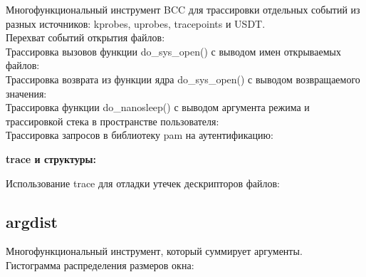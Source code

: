 Многофункциональный инструмент BCC для трассировки отдельных
событий из разных источников: kprobes, uprobes, tracepoints и USDT. \\

\noindent Перехват событий открытия файлов: \\
\noindent Трассировка вызовов функции do\_sys\_open() с выводом имен открываемых файлов: \\
\noindent Трассировка возврата из функции ядра do\_sys\_open() с выводом возвращаемого значения: \\
\noindent Трассировка функции do\_nanosleep() с выводом аргумента режима и трассировкой стека в пространстве пользователя: \\
\noindent Трассировка запросов в библиотеку pam на аутентификацию: \\

\noindent \textbf{trace и структуры:} \\

\noindent Использование trace для отладки утечек дескрипторов файлов: \\

\subsection{argdist}
Многофункциональный инструмент, который суммирует аргументы. \\

\noindent Гистограмма распределения размеров окна: \\

